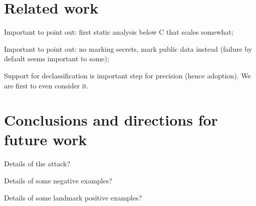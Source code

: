 \documentclass[letterpaper,10pt]{IEEEtran} %
\begin{document}
\section{Related work}

\begin{compactitem}
\item Important to point out: first static analysis below C that scales somewhat;
\item Important to point out: no marking secrets, mark public data
  instead (failure by default seems important to some);
\item Support for declassification is important step for precision
  (hence adoption). We are first to even consider it.
\end{compactitem}

\section{Conclusions and directions for future work}





\appendix

\begin{compactitem}
\item Details of the attack?
\item Details of some negative examples?
\item Details of some landmark positive examples?
\end{compactitem}
\end{document}
